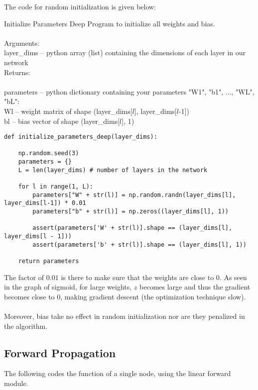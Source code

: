 \documentclass[a4paper]{article}
\begin{document}
\begin{enumerate}
The code for random initialization is given below: 
\begin{alg}{Initialize Parameters Deep}{} Program to initialize all weights and bias. \\~\\
Arguments:\\
layer\_dims -- python array (list) containing the dimensions of each layer in our network\\
Returns: \\~\\
parameters -- python dictionary containing your parameters "W1", "b1", ..., "WL", "bL": \\
Wl -- weight matrix of shape (layer\_dims[$l$], layer\_dims[$l$-1])\\
bl -- bias vector of shape (layer\_dims[$l$], 1)\\
\begin{verbatim}
def initialize_parameters_deep(layer_dims):
    
    np.random.seed(3)
    parameters = {}
    L = len(layer_dims) # number of layers in the network

    for l in range(1, L):
        parameters["W" + str(l)] = np.random.randn(layer_dims[l], layer_dims[l-1]) * 0.01
        parameters["b" + str(l)] = np.zeros((layer_dims[l], 1))
        
        assert(parameters['W' + str(l)].shape == (layer_dims[l], layer_dims[l - 1]))
        assert(parameters['b' + str(l)].shape == (layer_dims[l], 1))
        
    return parameters
\end{verbatim}
\end{alg}

The factor of $0.01$ is there to make sure that the weights are close to $0$. As seen in the graph of sigmoid, for large weights, $z$ becomes large and thus the gradient becomes close to $0$, making gradient descent (the optimization technique slow). \\~\\
Moreover, bias take no effect in random initialization nor are they penalized in the algorithm. 

\subsection{Forward Propagation}
The following codes the function of a single node, using the linear forward module. 


\end{enumerate}
\end{document}
